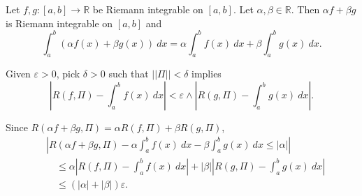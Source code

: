 \documentclass{notes}
\begin{document}
  \begin{lem}
    Let $f, g \colon [a, b] \to \mathbb R$ be Riemann integrable on $[a, b]$.
    Let $\alpha, \beta \in \mathbb R$.
    Then $\alpha f + \beta g$ is Riemann integrable on $[a, b]$ and 
    \[
      \int_a^b (\alpha f(x) + \beta g(x))\ dx = \alpha \int_a^b f(x)\ dx + \beta \int_a^b g(x)\ dx.
    \]
  \end{lem}
  
  \begin{prf}
    Given $\varepsilon > 0$, pick $\delta > 0$ such that $|| \Pi || < \delta$ implies 
    \[
      \left | R(f, \Pi) - \int_a^b f(x)\ dx \right | < \varepsilon \land \left | R(g, \Pi) - \int_a^b g(x)\ dx \right |.
    \]
    
    Since $R(\alpha f + \beta g, \Pi) = \alpha R(f, \Pi) + \beta R(g, \Pi)$, 
    \begin{align*}
      &\left | R(\alpha f + \beta g, \Pi) - \alpha \int_a^b f(x)\ dx - \beta \int_a^b g(x)\ dx \leq \left | \alpha \right | \right | \\ 
      &\quad \leq \alpha \left | R(f, \Pi) - \int_a^b f(x)\ dx \right | + \left | \beta \right | \left | R(g, \Pi) - \int_a^b g(x)\ dx \right | \\ 
      &\quad \leq (\left | \alpha \right | + \left | \beta \right |) \varepsilon.
    \end{align*}
  \end{prf}
\end{document}

